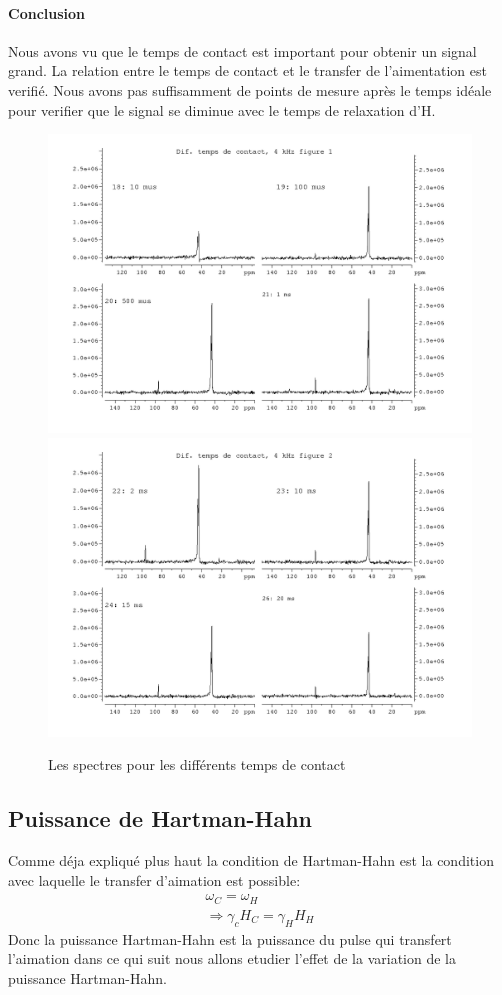 \documentclass[a4paper,12pt]{scrartcl}
\begin{document}
   \paragraph{Conclusion}
    Nous avons vu que le temps de contact est important pour obtenir un signal grand. La relation entre le temps de contact et le transfer de l'aimentation est verifié. Nous avons pas suffisamment de points de mesure après le temps idéale pour verifier que le signal se diminue avec le temps de relaxation d'H.
\begin{figure}
    \includegraphics[width=\textwidth]{bilder/figure3.png}
    \includegraphics[width=\textwidth]{bilder/figure4.png}
    \caption{\label{temps} Les spectres pour les différents temps de contact}
   \end{figure}
  \subsection{Puissance de Hartman-Hahn}
 Comme déja expliqué plus haut la condition de Hartman-Hahn est la condition avec laquelle le transfer d'aimation est possible:
    \begin{eqnarray*}
     \omega_C=\omega_H\\
     \Rightarrow \gamma_c H_C=\gamma_H H_H
    \end{eqnarray*}
 Donc la puissance Hartman-Hahn est la puissance du pulse qui transfert l'aimation dans ce qui suit nous allons etudier l'effet de la variation de la puissance Hartman-Hahn.
\end{document}
